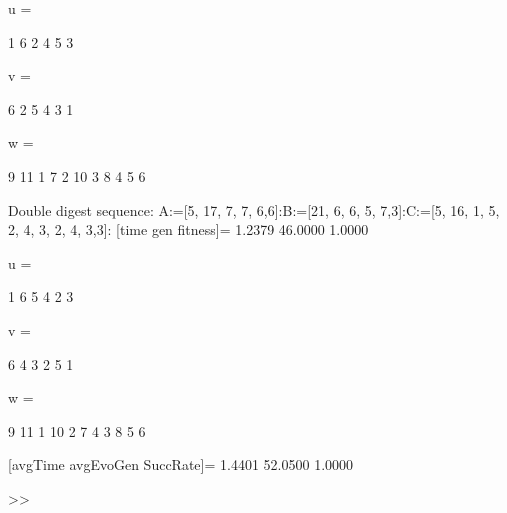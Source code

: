 u =

     1     6     2     4     5     3


v =

     6     2     5     4     3     1


w =

     9    11     1     7     2    10     3     8     4     5     6

Double digest sequence:
A:=[5, 17, 7, 7, 6,6]:B:=[21, 6, 6, 5, 7,3]:C:=[5, 16, 1, 5, 2, 4, 3, 2, 4, 3,3]:
[time gen fitness]=
    1.2379   46.0000    1.0000


u =

     1     6     5     4     2     3


v =

     6     4     3     2     5     1


w =

     9    11     1    10     2     7     4     3     8     5     6

[avgTime  avgEvoGen  SuccRate]=
    1.4401   52.0500    1.0000

>> 